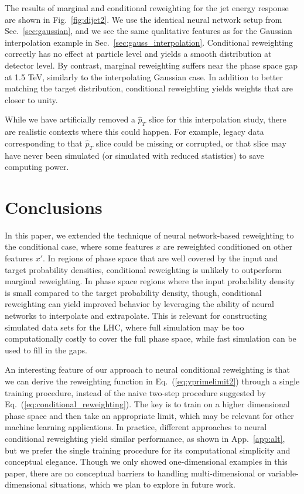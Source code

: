 \documentclass[aps,prx,reprint,preprintnumbers,superscriptaddress,nofootinbib,longbibliography,floatfix]{revtex4-2}
\DeclareRobustCommand{\Sec}[1]{Sec.~\ref{sec:#1}}
\DeclareRobustCommand{\App}[1]{App.~\ref{app:#1}}
\DeclareRobustCommand{\Fig}[1]{Fig.~\ref{fig:#1}}
\DeclareRobustCommand{\Eq}[1]{Eq.~(\ref{eq:#1})}
\begin{document}
The results of marginal and conditional reweighting for the jet energy response are shown in \Fig{dijet2}.
%
We use the identical neural network setup from \Sec{gaussian}, and we see the same qualitative features as for the Gaussian interpolation example in \Sec{gauss_interpolation}.
%
Conditional reweighting correctly has no effect at particle level and yields a smooth distribution at detector level. 
%
By contrast, marginal reweighting suffers near the phase space gap at 1.5 TeV, similarly to the interpolating Gaussian case.
%
In addition to better matching the target distribution, conditional reweighting yields weights that are closer to unity.


While we have artificially removed a $\hat{p}_T$ slice for this interpolation study, there are realistic contexts where this could happen.
%
For example, legacy data corresponding to that $\hat{p}_T$ slice could be missing or corrupted, or that slice may have never been simulated (or simulated with reduced statistics) to save computing power.
%

\section{Conclusions}
\label{sec:conclusions}

In this paper, we extended the technique of neural network-based reweighting to the conditional case, where some features $x$ are reweighted conditioned on other features $x'$.
%
In regions of phase space that are well covered by the input and target probability densities, conditional reweighting is unlikely to outperform marginal reweighting.
%
In phase space regions where the input probability density is small compared to the target probability density, though, conditional reweighting can yield improved behavior by leveraging the ability of neural networks to interpolate and extrapolate.
%
This is relevant for constructing simulated data sets for the LHC, where full simulation may be too computationally costly to cover the full phase space, while fast simulation can be used to fill in the gaps.


An interesting feature of our approach to neural conditional reweighting is that we can derive the reweighting function in \Eq{yprimelimit2} through a single training procedure, instead of the naive two-step procedure suggested by \Eq{conditional_reweighting}.
%
The key is to train on a higher dimensional phase space and then take an appropriate limit, which may be relevant for other machine learning applications.
%
In practice, different approaches to neural conditional reweighting yield similar performance, as shown in \App{alt}, but we prefer the single training procedure for its computational simplicity and conceptual elegance.
%
Though we only showed one-dimensional examples in this paper, there are no conceptual barriers to handling multi-dimensional or variable-dimensional situations, which we plan to explore in future work.
\end{document}
